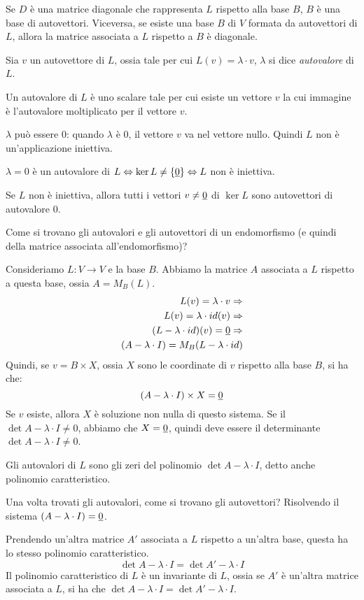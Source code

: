Se $D$ \`e una matrice diagonale che rappresenta $L$ rispetto alla base $B$, $B$ \`e una base di autovettori. Viceversa, se esiste una base $B$ di $V$ formata da autovettori di $L$, allora la matrice associata a $L$ rispetto a $B$ \`e diagonale.

Sia $v$ un autovettore di $L$, ossia tale per cui $L(v) = \lambda \cdot v$, $\lambda$ si dice \emph{autovalore} di $L$.

Un autovalore di $L$ \`e uno scalare tale per cui esiste un vettore $v$ la cui immagine \`e l'autovalore moltiplicato per il vettore $v$.

$\lambda$ pu\`o essere 0: quando $\lambda$ \`e 0, il vettore $v$ va nel vettore nullo. Quindi $L$ non \`e un'applicazione iniettiva.

$\lambda = 0$ \`e un autovalore di $L \Leftrightarrow \ker L \neq \{ \underline{0} \} \Leftrightarrow L$ non \`e iniettiva.

Se $L$ non \`e iniettiva, allora tutti i vettori $v \neq \underline{0}$ di $\ker L$ sono autovettori di autovalore 0.

Come si trovano gli autovalori e gli autovettori di un endomorfismo (e quindi della matrice associata all'endomorfismo)?

Consideriamo $L : V \to V$ e la base $B$. Abbiamo la matrice $A$ associata a $L$ rispetto a questa base, ossia $A = M_{B} (L)$.
\begin{align*}
L(v) = \lambda \cdot v \Rightarrow \\
L(v) = \lambda \cdot id(v) \Rightarrow \\
(L - \lambda \cdot id) (v) = \underline{0} \Rightarrow \\
(A - \lambda \cdot I) = M_B (L - \lambda \cdot id)
\end{align*}
Quindi, se $v = B \times X$, ossia $X$ sono le coordinate di $v$ rispetto alla base $B$, si ha che:
\[
(A - \lambda \cdot I) \times X = \underline{0}
\]
Se $v$ esiste, allora $X$ \`e soluzione non nulla di questo sistema. Se il $\det{A - \lambda \cdot I} \neq 0$, abbiamo che $X = \underline{0}$, quindi deve essere il determinante $\det{A - \lambda \cdot I} \neq 0$.

Gli autovalori di $L$ sono gli zeri del polinomio $\det{A - \lambda \cdot I}$, detto anche polinomio caratteristico.

Una volta trovati gli autovalori, come si trovano gli autovettori? Risolvendo il sistema $(A - \lambda \cdot I) = \underline{0}$.

Prendendo un'altra matrice $A'$ associata a $L$ rispetto a un'altra base, questa ha lo stesso polinomio caratteristico.
\[
\det{A - \lambda \cdot I} = \det{A' - \lambda \cdot I}
\]
Il polinomio caratteristico di $L$ \`e un invariante di $L$, ossia se $A'$ \`e un'altra matrice associata a $L$, si ha che $\det{A - \lambda \cdot I} = \det{A' - \lambda \cdot I}$.

